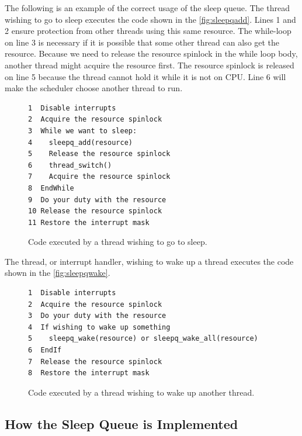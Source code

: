 \documentclass[twoside,a4paper]{report}
\begin{document}
The following is an example of the correct usage of the sleep queue.
The thread wishing to go to sleep executes the code shown in the
\autoref{fig:sleepqadd}. Lines 1 and 2 ensure protection from other
threads using this same resource. The while-loop on line 3 is
necessary if it is possible that some other thread can also get the
resource. Because we need to release the resource spinlock in the
while loop body, another thread might acquire the resource first. The
resource spinlock is released on line 5 because the thread cannot hold
it while it is not on CPU. Line 6 will make the scheduler choose
another thread to run.

\begin{figure}
\begin{center}
\begin{verbatim}
1  Disable interrupts
2  Acquire the resource spinlock
3  While we want to sleep:
4    sleepq_add(resource)
5    Release the resource spinlock
6    thread_switch()
7    Acquire the resource spinlock
8  EndWhile
9  Do your duty with the resource
10 Release the resource spinlock
11 Restore the interrupt mask
\end{verbatim}
\caption{Code executed by a thread wishing to go to sleep.}
\label{fig:sleepqadd}
\end{center}
\end{figure}

The thread, or interrupt handler, wishing to wake up a thread
executes the code shown in the \autoref{fig:sleepqwake}.

\begin{figure}
\begin{center}
\begin{verbatim}
1  Disable interrupts
2  Acquire the resource spinlock
3  Do your duty with the resource
4  If wishing to wake up something
5    sleepq_wake(resource) or sleepq_wake_all(resource)
6  EndIf
7  Release the resource spinlock
8  Restore the interrupt mask
\end{verbatim}
\caption{Code executed by a thread wishing to wake up another thread.}
\label{fig:sleepqwake}
\end{center}
\end{figure}

\subsection{How the Sleep Queue is Implemented}
\end{document}
